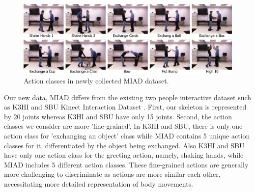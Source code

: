 \documentclass[10pt,twocolumn,letterpaper]{article}
\begin{document}
\begin{figure}[htb]
\begin{center}
\includegraphics[width=6.8in]{newactions.pdf}
\caption{Action classes in newly collected MIAD dataset.  \label{fig:newactions}}
\end{center}
\end{figure}

Our new data, MIAD differs from the existing two people interactive dataset such as K3HI \cite{K3HI} and SBU Kinect Interaction Dataset \cite{Yun2012}. First, our skeleton is represented by 20 joints whereas K3HI and SBU have only 15 joints. Second, the action classes we consider are more 'fine-grained'. In K3HI and SBU, there is only one action class for 'exchanging an object' class while MIAD contains 5 unique action classes for it, differentiated by the object being exchanged. Also K3HI and SBU have only one action class for the greeting action, namely, shaking hands, while MIAD includes 5 different action classes. These fine-grained actions are generally more challenging to discriminate as actions are more similar each other, necessitating more detailed representation of body movements.





\end{document}
